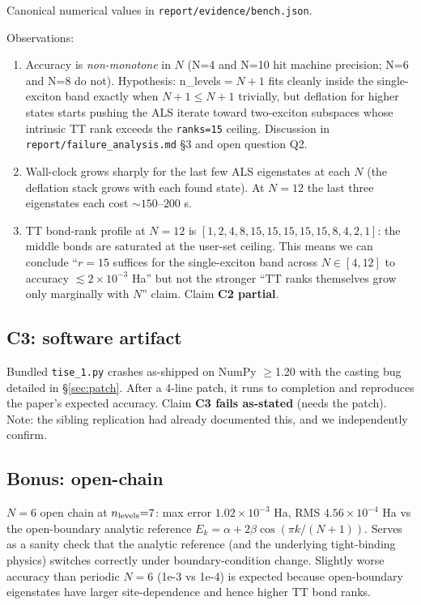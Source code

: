 \documentclass[11pt]{article}
\begin{document}
Canonical numerical values in \texttt{report/evidence/bench.json}.

Observations:
\begin{enumerate}
\item Accuracy is \emph{non-monotone} in $N$ (N=4 and N=10 hit machine
      precision; N=6 and N=8 do not).  Hypothesis: n\_levels${}=N{+}1$ fits
      cleanly inside the single-exciton band exactly when $N+1 \le N+1$
      trivially, but deflation for higher states starts pushing the ALS
      iterate toward two-exciton subspaces whose intrinsic TT rank exceeds
      the \texttt{ranks{=}15} ceiling.  Discussion in
      \texttt{report/failure\_analysis.md} \S3 and open question Q2.
\item Wall-clock grows sharply for the last few ALS eigenstates at each $N$
      (the deflation stack grows with each found state).  At $N{=}12$ the last
      three eigenstates each cost $\sim 150$--$200$ s.
\item TT bond-rank profile at $N{=}12$ is
      $[1,2,4,8,15,15,15,15,15,8,4,2,1]$: the middle bonds are saturated at
      the user-set ceiling.  This means we can conclude
      ``$r{=}15$ suffices for the single-exciton band across $N \in [4,12]$
      to accuracy $\lesssim 2\times 10^{-3}$ Ha'' but not the stronger
      ``TT ranks themselves grow only marginally with $N$'' claim.  Claim
      \textbf{C2 partial}.
\end{enumerate}

\subsection{C3: software artifact}
Bundled \texttt{tise\_1.py} crashes as-shipped on NumPy $\ge$1.20 with the
casting bug detailed in \S\ref{sec:patch}.  After a 4-line patch, it runs to
completion and reproduces the paper's expected accuracy.  Claim
\textbf{C3 fails as-stated} (needs the patch).  Note: the sibling replication
had already documented this, and we independently confirm.

\subsection{Bonus: open-chain}
$N{=}6$ open chain at $n_{\rm levels}{=}7$: max error $1.02\times 10^{-3}$ Ha,
RMS $4.56\times 10^{-4}$ Ha vs the open-boundary analytic reference
$E_k = \alpha + 2\beta\cos(\pi k/(N+1))$.  Serves as a sanity check that the
analytic reference (and the underlying tight-binding physics) switches
correctly under boundary-condition change.  Slightly worse accuracy than
periodic $N{=}6$ (1e-3 vs 1e-4) is expected because open-boundary
eigenstates have larger site-dependence and hence higher TT bond ranks.
\end{document}
